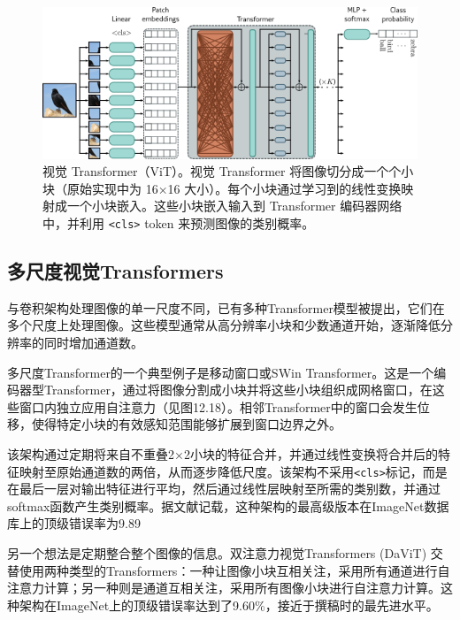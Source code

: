 \begin{figure}[ht!]
\centering
\includegraphics[width=0.7\linewidth]{png/chapter12/TransformerVisionTransformer.png}
\caption{视觉 Transformer（ViT）。视觉 Transformer 将图像切分成一个个小块（原始实现中为 16×16 大小）。每个小块通过学习到的线性变换映射成一个小块嵌入。这些小块嵌入输入到 Transformer 编码器网络中，并利用 \texttt{\textless cls\textgreater} token 来预测图像的类别概率。}
\end{figure}


\subsection{多尺度视觉Transformers}
与卷积架构处理图像的单一尺度不同，已有多种Transformer模型被提出，它们在多个尺度上处理图像。这些模型通常从高分辨率小块和少数通道开始，逐渐降低分辨率的同时增加通道数。

多尺度Transformer的一个典型例子是移动窗口或SWin Transformer。这是一个编码器型Transformer，通过将图像分割成小块并将这些小块组织成网格窗口，在这些窗口内独立应用自注意力（见图12.18）。相邻Transformer中的窗口会发生位移，使得特定小块的有效感知范围能够扩展到窗口边界之外。

该架构通过定期将来自不重叠2×2小块的特征合并，并通过线性变换将合并后的特征映射至原始通道数的两倍，从而逐步降低尺度。该架构不采用\texttt{\textless cls\textgreater}标记，而是在最后一层对输出特征进行平均，然后通过线性层映射至所需的类别数，并通过softmax函数产生类别概率。据文献记载，这种架构的最高级版本在ImageNet数据库上的顶级错误率为9.89%

另一个想法是定期整合整个图像的信息。双注意力视觉Transformers (DaViT) 交替使用两种类型的Transformers：一种让图像小块互相关注，采用所有通道进行自注意力计算；另一种则是通道互相关注，采用所有图像小块进行自注意力计算。这种架构在ImageNet上的顶级错误率达到了9.60\%，接近于撰稿时的最先进水平。

